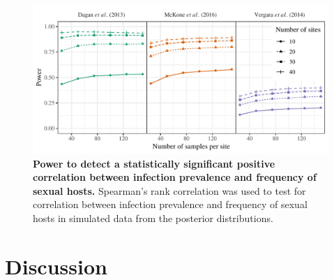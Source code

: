 \documentclass{article}\usepackage[]{graphicx}\usepackage[]{color}
\begin{document}
\begin{figure}[!ht]
\includegraphics[width=\textwidth]{../fig/power.pdf}
\caption{{\bf Power to detect a statistically significant positive correlation between infection prevalence and frequency of sexual hosts.}
Spearman's rank correlation was used to test for correlation between infection prevalence and frequency of sexual hosts in simulated data from the posterior distributions.
}
\label{fig:power}
\end{figure}

\section{Discussion}
\end{document}
